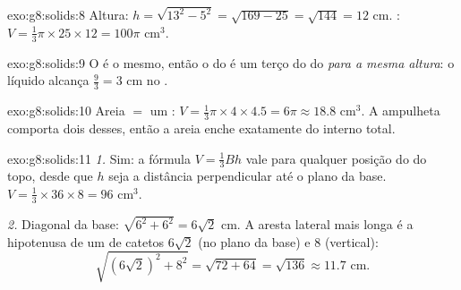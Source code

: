 \begin{solution}{exo:g8:solids:8}
Altura: $h = \sqrt{13^2 - 5^2} = \sqrt{169 - 25} = \sqrt{144} = 12$
cm. : $V = \frac13 \pi \times 25 \times 12 = 100\pi$ cm$^3$.
\end{solution}

\begin{solution}{exo:g8:solids:9}
O  é o mesmo, então o  do  é um terço do  do
 \emph{para a mesma altura}: o líquido alcança
$\frac{9}{3} = 3$ cm no .
\end{solution}

\begin{solution}{exo:g8:solids:10}
Areia $=$ um : $V = \frac13 \pi \times 4 \times 4.5 = 6\pi
\approx 18.8$ cm$^3$. A ampulheta comporta dois  desses, então a
areia enche exatamente  do  interno total.
\end{solution}

\begin{solution}{exo:g8:solids:11}
\emph{1.} Sim: a fórmula $V = \frac13 Bh$ vale para qualquer posição
do  do topo, desde que $h$ seja a distância perpendicular até o
plano da base. $V = \frac13 \times 36 \times 8 = 96$ cm$^3$.

\emph{2.} Diagonal da base: $\sqrt{6^2 + 6^2} = 6\sqrt2$ cm. A aresta
lateral mais longa é a hipotenusa de um  de catetos
$6\sqrt2$ (no plano da base) e $8$ (vertical):
\[
\sqrt{(6\sqrt2)^2 + 8^2} = \sqrt{72 + 64} = \sqrt{136} \approx 11.7
\text{ cm}.
\]
\end{solution}

